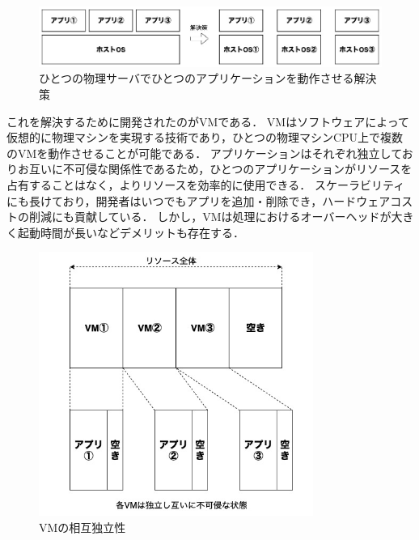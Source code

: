 \begin{figure}[htbp]
\begin{center}
    \includegraphics[width=\textwidth]{./figures/only-on-physical-server.jpg}
    \caption{ひとつの物理サーバでひとつのアプリケーションを動作させる解決策}
\end{center}
\end{figure}

これを解決するために開発されたのがVMである．
VMはソフトウェアによって仮想的に物理マシンを実現する技術であり，ひとつの物理マシンCPU上で複数のVMを動作させることが可能である．
アプリケーションはそれぞれ独立しておりお互いに不可侵な関係性であるため，ひとつのアプリケーションがリソースを占有することはなく，よりリソースを効率的に使用できる．
スケーラビリティにも長けており，開発者はいつでもアプリを追加・削除でき，ハードウェアコストの削減にも貢献している．
しかし，VMは処理におけるオーバーヘッドが大きく起動時間が長いなどデメリットも存在する．

\begin{figure}[htbp]
\begin{center}
    \includegraphics[width=0.8\textwidth]{./figures/resource-on-vm.jpg}
    \caption{VMの相互独立性}
\end{center}
\end{figure}

